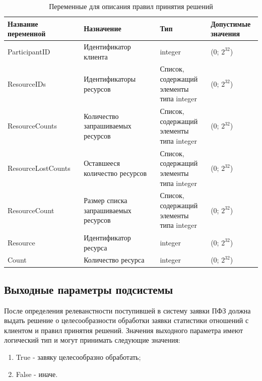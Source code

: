 \documentclass[utf8x, 12pt]{G7-32}
\begin{document}
\begin{table}[ht!]
        \caption{Переменные для описания правил принятия решений}
        \begin{center}
                \begin{tabular}{|p{0.3\linewidth}|p{0.3\linewidth}|p{0.2\linewidth}|p{0.2\linewidth}|}
                        \hline
                        \textbf{Название переменной} & \textbf{Назначение} &\textbf{Тип} & \textbf{Допустимые значения}\\
                        \hline
                        ParticipantID & Идентификатор клиента & integer & (0; $2^{32}$) \\
                        \hline   
                        ResourceIDs & Идентификаторы ресурсов & Список, содержащий элементы типа integer & (0; $2^{32}$) \\
                        \hline   
                        ResourceCounts & Количество запрашиваемых ресурсов & Список, содержащий элементы типа integer & (0; $2^{32}$) \\
                        \hline   
                        ResourceLostCounts & Оставшееся количество ресурсов & Список, содержащий элементы типа integer & (0; $2^{32}$) \\
                        \hline   
                        ResourceCount & Размер списка запрашиваемых ресурсов & Список, содержащий элементы типа integer & (0; $2^{32}$) \\
                        \hline   
                        Resource & Идентификатор ресурса & integer & (0; $2^{32}$) \\
                        \hline   
                        Count & Количество ресурса & integer & (0; $2^{32}$) \\
                        \hline   
               \end{tabular}        
               \label{tabl:input3}
        \end{center}
\end{table}

\subsection{Выходные параметры подсистемы}

После определения релеванстности поступившей в систему заявки ПФЗ должна выдать 
решение о целесообразности обработки заявки статистики отношений с клиентом и
правил принятия решений. Значения выходного параметра имеют логический тип и могут 
принимать следующие значения:
\begin{enumerate}
        \item True - завяку целесообразно обработать;
        \item False - иначе.
\end{enumerate}
\end{document}
